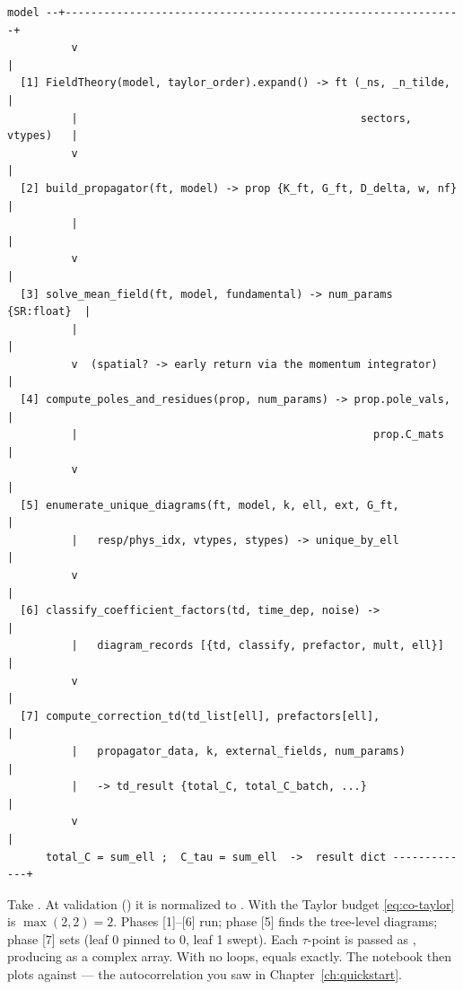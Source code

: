 \begin{lstlisting}[style=console]
  model --+--------------------------------------------------------------+
          v                                                              |
  [1] FieldTheory(model, taylor_order).expand() -> ft (_ns, _n_tilde,    |
          |                                            sectors, vtypes)   |
          v                                                              |
  [2] build_propagator(ft, model) -> prop {K_ft, G_ft, D_delta, w, nf}   |
          |                                                              |
          v                                                              |
  [3] solve_mean_field(ft, model, fundamental) -> num_params {SR:float}  |
          |                                                              |
          v  (spatial? -> early return via the momentum integrator)      |
  [4] compute_poles_and_residues(prop, num_params) -> prop.pole_vals,    |
          |                                              prop.C_mats      |
          v                                                              |
  [5] enumerate_unique_diagrams(ft, model, k, ell, ext, G_ft,           |
          |   resp/phys_idx, vtypes, stypes) -> unique_by_ell            |
          v                                                              |
  [6] classify_coefficient_factors(td, time_dep, noise) ->              |
          |   diagram_records [{td, classify, prefactor, mult, ell}]     |
          v                                                              |
  [7] compute_correction_td(td_list[ell], prefactors[ell],             |
          |   propagator_data, k, external_fields, num_params)           |
          |   -> td_result {total_C, total_C_batch, ...}                 |
          v                                                              |
      total_C = sum_ell ;  C_tau = sum_ell  ->  result dict -------------+
\end{lstlisting}

\begin{example}[A Hawkes-like $k=2$ tree run]
Take . At validation
() it is normalized to \code{[('dn',1),('dn',2)]}.
With  the Taylor budget \eqref{eq:co-taylor} is
$\max(2,2)=2$. Phases [1]--[6] run; phase [5] finds the tree-level diagrams; phase
[7] sets  (leaf 0 pinned to 0,
leaf 1 swept). Each $\tau$-point is passed as , producing
 as a complex array. With no loops,  equals
 exactly. The notebook then plots 
against  --- the autocorrelation you saw in
Chapter~\ref{ch:quickstart}.
\end{example}

